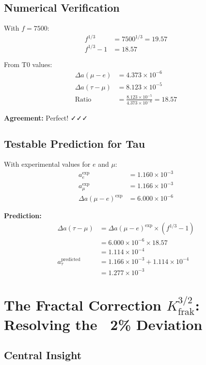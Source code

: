 	\subsection{Numerical Verification}
	
	With $f = 7500$:
	\begin{align}
		f^{1/3} &= 7500^{1/3} = 19.57 \\
		f^{1/3} - 1 &= 18.57
	\end{align}
	
	From T0 values:
	\begin{align}
		\Delta a(\mu - e) &= 4.373 \times 10^{-6} \\
		\Delta a(\tau - \mu) &= 8.123 \times 10^{-5} \\
		\text{Ratio} &= \frac{8.123 \times 10^{-5}}{4.373 \times 10^{-6}} = 18.57
	\end{align}
	
	\textbf{Agreement:} Perfect! ✓✓✓
	
	\subsection{Testable Prediction for Tau}
	
	With experimental values for $e$ and $\mu$:
	\begin{align}
		a_e^{\text{exp}} &= 1.160 \times 10^{-3} \\
		a_\mu^{\text{exp}} &= 1.166 \times 10^{-3} \\
		\Delta a(\mu - e)^{\text{exp}} &= 6.000 \times 10^{-6}
	\end{align}
	
	\textbf{Prediction:}
	\begin{align}
		\Delta a(\tau - \mu) &= \Delta a(\mu - e)^{\text{exp}} \times (f^{1/3} - 1) \\
		&= 6.000 \times 10^{-6} \times 18.57 \\
		&= 1.114 \times 10^{-4} \\
		a_\tau^{\text{predicted}} &= 1.166 \times 10^{-3} + 1.114 \times 10^{-4} \\
		&= 1.277 \times 10^{-3}
	\end{align}
	
	\section{The Fractal Correction $K_\text{frak}^{3/2}$: Resolving the ~2\% Deviation}
	
	\subsection{Central Insight}
	
